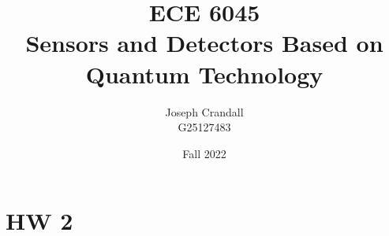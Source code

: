 
\usepackage{algorithm, algpseudocode, bm, color, gensymb, listings, siunitx, soul, subfiles, verbatim}
\usepackage[a4paper, total={7.5in, 10in}]{geometry}

\title{ECE 6045 \\ Sensors and Detectors Based on Quantum Technology}
\author{Joseph Crandall \\ G25127483}
\date{Fall 2022}


\maketitle

\begin{comment}

\section{Hw 1}


\end{comment}

\section{HW 2}


